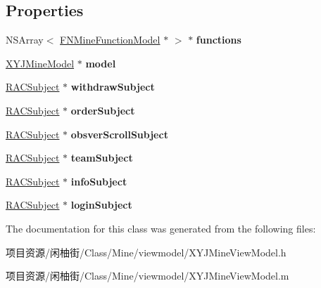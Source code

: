 \subsection*{Properties}
\begin{DoxyCompactItemize}
\item 
\mbox{\label{interface_x_y_j_mine_view_model_a06afa20b6421dbe9f21a38d638b88bb9}} 
N\+S\+Array$<$ \mbox{\hyperlink{interface_f_n_mine_function_model}{F\+N\+Mine\+Function\+Model}} $\ast$ $>$ $\ast$ {\bfseries functions}
\item 
\mbox{\label{interface_x_y_j_mine_view_model_a2526211f25f4aa87b850d9de56c12229}} 
\mbox{\hyperlink{interface_x_y_j_mine_model}{X\+Y\+J\+Mine\+Model}} $\ast$ {\bfseries model}
\item 
\mbox{\label{interface_x_y_j_mine_view_model_a21fc9deb0d642cf2fdf062cb1427bd8d}} 
\mbox{\hyperlink{interface_r_a_c_subject}{R\+A\+C\+Subject}} $\ast$ {\bfseries withdraw\+Subject}
\item 
\mbox{\label{interface_x_y_j_mine_view_model_add97b8e068e78d5eee7ec15f23cc8f12}} 
\mbox{\hyperlink{interface_r_a_c_subject}{R\+A\+C\+Subject}} $\ast$ {\bfseries order\+Subject}
\item 
\mbox{\label{interface_x_y_j_mine_view_model_a3cc0e42a7ec9671e520a4f425e6071a6}} 
\mbox{\hyperlink{interface_r_a_c_subject}{R\+A\+C\+Subject}} $\ast$ {\bfseries obsver\+Scroll\+Subject}
\item 
\mbox{\label{interface_x_y_j_mine_view_model_a047e2917349486633e6c6a7b075754b2}} 
\mbox{\hyperlink{interface_r_a_c_subject}{R\+A\+C\+Subject}} $\ast$ {\bfseries team\+Subject}
\item 
\mbox{\label{interface_x_y_j_mine_view_model_aefb84c2cac79c6d99f44a493c844b617}} 
\mbox{\hyperlink{interface_r_a_c_subject}{R\+A\+C\+Subject}} $\ast$ {\bfseries info\+Subject}
\item 
\mbox{\label{interface_x_y_j_mine_view_model_a04462f6850265f7ec462f0702b7927c8}} 
\mbox{\hyperlink{interface_r_a_c_subject}{R\+A\+C\+Subject}} $\ast$ {\bfseries login\+Subject}
\end{DoxyCompactItemize}


The documentation for this class was generated from the following files\+:\begin{DoxyCompactItemize}
\item 
项目资源/闲柚街/\+Class/\+Mine/viewmodel/X\+Y\+J\+Mine\+View\+Model.\+h\item 
项目资源/闲柚街/\+Class/\+Mine/viewmodel/X\+Y\+J\+Mine\+View\+Model.\+m\end{DoxyCompactItemize}

